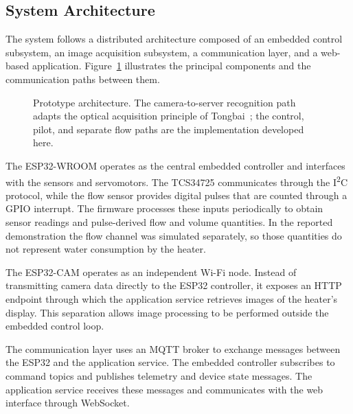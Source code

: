 \subsection{System Architecture}

The system follows a distributed architecture composed of an embedded control subsystem, an image acquisition subsystem,
a communication layer, and a web-based application.
Figure~\ref{fig:architecture} illustrates the principal components and the communication paths between them.

\begin{figure}[!t]
    \centering
    \resizebox{0.96\linewidth}{!}{}
    \caption{Prototype architecture. The camera-to-server recognition path adapts the optical acquisition principle of Tongbai~\cite{tongbai2024}; the control, pilot, and separate flow paths are the implementation developed here.}
\label{fig:architecture}
\end{figure}

The ESP32-WROOM operates as the central embedded controller and interfaces with the sensors and servomotors.
The TCS34725 communicates through the I\textsuperscript{2}C protocol, while the flow sensor provides digital
pulses that are counted through a GPIO interrupt.
The firmware processes these inputs periodically to obtain sensor readings and pulse-derived flow and volume quantities. In the reported demonstration the flow channel was simulated separately, so those quantities do not represent water consumption by the heater.

The ESP32-CAM operates as an independent Wi-Fi node.
Instead of transmitting camera data directly to the ESP32 controller, it exposes an HTTP endpoint through which
the application service retrieves images of the heater's display.
This separation allows image processing to be performed outside the embedded control loop.

The communication layer uses an MQTT broker to exchange messages between the ESP32 and the application service.
The embedded controller subscribes to command topics and publishes telemetry and device state messages.
The application service receives these messages and communicates with the web interface through WebSocket.

